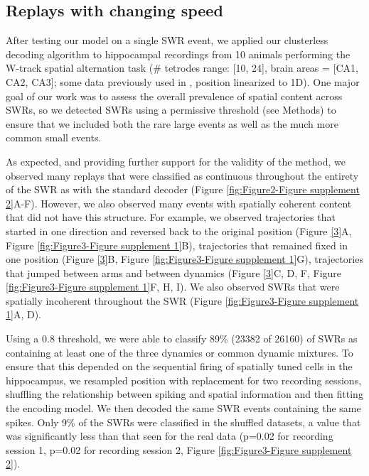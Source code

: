 \documentclass[times, twoside]{zHenriquesLab-StyleBioRxiv}
\begin{document}
\subsection*{Replays with changing speed}

After testing our model on a single SWR event, we applied our clusterless decoding algorithm to hippocampal recordings from 10 animals performing the W-track spatial alternation task (\# tetrodes range: [10, 24], brain areas = [CA1, CA2, CA3]; some data previously used in \cite{KarlssonAwakereplayremote2009, KayConstantSubsecondCycling2020, CarrTransientSlowGamma2012}, position linearized to 1D). One major goal of our work was to assess the overall prevalence of spatial content across SWRs, so we detected SWRs using a permissive threshold (see Methods) to ensure that we included both the rare large events as well as the much more common small events. 

As expected, and providing further support for the validity of the method, we observed many replays that were classified as continuous throughout the entirety of the SWR as with the standard decoder (Figure \ref{fig:Figure2-Figure supplement 2}A-F). However, we also observed many events with spatially coherent content that did not have this structure. For example, we observed trajectories that started in one direction and reversed back to the original position (Figure \ref{3}A, Figure \ref{fig:Figure3-Figure supplement 1}B), trajectories that remained fixed in one position (Figure \ref{3}B, Figure \ref{fig:Figure3-Figure supplement 1}G), trajectories that jumped between arms and between dynamics (Figure \ref{3}C, D, F, Figure \ref{fig:Figure3-Figure supplement 1}F, H, I). We also observed SWRs that were spatially incoherent throughout the SWR (Figure \ref{fig:Figure3-Figure supplement 1}A, D).

Using a 0.8 threshold, we were able to classify 89\% (23382 of 26160) of SWRs as containing at least one of the three dynamics or common dynamic mixtures. To ensure that this depended on the sequential firing of spatially tuned cells in the hippocampus, we resampled position with replacement for two recording sessions, shuffling the relationship between spiking and spatial information and then fitting the encoding model. We then decoded the same SWR events containing the same spikes. Only 9\% of the SWRs were classified in the shuffled datasets, a value that was significantly less than that seen for the real data (p=0.02 for recording session 1, p=0.02 for recording session 2, Figure \ref{fig:Figure3-Figure supplement 2}).
\end{document}
